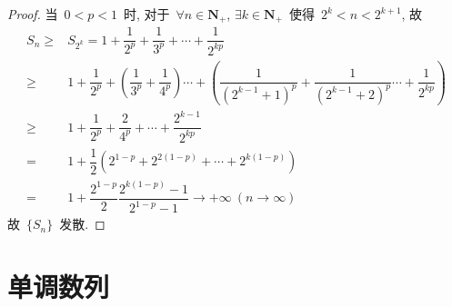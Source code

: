 \documentclass[UTF8,a4paper,10pt,twoside]{book}
\begin{document}
\begin{enumerate}
\begin{proof}
		      当~$0<p<1$~时, 对于~$\forall n\in\mathbf{N}_{+}$, $\exists k\in\mathbf{N}_{+}$~使得~$2^k<n<2^{k+1}$, 故
		      \begin{equation*}
			      \begin{split}
				      S_n\geqslant & S_{2^k}=1+\dfrac{1}{2^p}+\dfrac{1}{3^p}+\cdots+\dfrac{1}{2^{kp}}                                                                                         \\
				      \geqslant        & 1+\dfrac{1}{2^p}+\left(\dfrac{1}{3^p}+\dfrac{1}{4^p}\right)\cdots+\left(\dfrac{1}{(2^{k-1}+1)^p}+\dfrac{1}{(2^{k-1}+2)^p}\cdots+\dfrac{1}{2^{kp}}\right) \\
				      \geqslant        & 1+\dfrac{1}{2^p}+\dfrac{2}{4^p}+\cdots+\dfrac{2^{k-1}}{2^{kp}}                                                                                           \\
				      =                & 1+\dfrac{1}{2}(2^{1-p}+2^{2(1-p)}+\cdots+2^{k(1-p)})                                                                                                     \\
				      =                & 1+\dfrac{2^{1-p}}{2}\dfrac{2^{k(1-p)}-1}{2^{1-p}-1}\to+\infty\ (n\to\infty)
			      \end{split}
		      \end{equation*}
		      故~$\{S_n\}$~发散.\qedhere
	      \end{proof}
\end{enumerate}

\section{单调数列}
\end{document}
